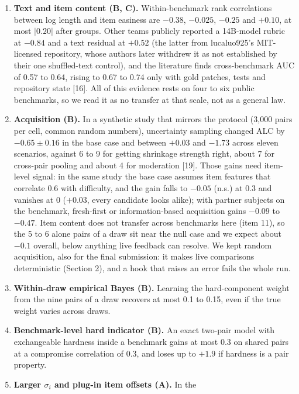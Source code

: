 \documentclass[
]{article}
\begin{document}
\begin{enumerate}
  to 27 labels at B1 to B3.
\item
  \textbf{Text and item content (B, C).} Within-benchmark rank
  correlations between log length and item easiness are \(-0.38\),
  \(-0.025\), \(-0.25\) and \(+0.10\), at most \(|0.20|\) after groups.
  Other teams publicly reported a 14B-model rubric at \(-0.84\) and a
  text residual at \(+0.52\) (the latter from lucaluo925's MIT-licensed
  repository, whose authors later withdrew it as not established by
  their one shuffled-text control), and the literature finds
  cross-benchmark AUC of 0.57 to 0.64, rising to 0.67 to 0.74 only with
  gold patches, tests and repository state {[}16{]}. All of this
  evidence rests on four to six public benchmarks, so we read it as no
  transfer at that scale, not as a general law.
\item
  \textbf{Acquisition (B).} In a synthetic study that mirrors the
  protocol (3,000 pairs per cell, common random numbers), uncertainty
  sampling changed ALC by \(-0.65 \pm 0.16\) in the base case and
  between \(+0.03\) and \(-1.73\) across eleven scenarios, against 6 to
  9 for getting shrinkage strength right, about 7 for cross-pair pooling
  and about 4 for moderation {[}19{]}. Those gains need item-level
  signal: in the same study the base case assumes item features that
  correlate 0.6 with difficulty, and the gain falls to \(-0.05\) (n.s.)
  at 0.3 and vanishes at 0 (\(+0.03\), every candidate looks alike);
  with partner subjects on the benchmark, fresh-first or
  information-based acquisition gains \(-0.09\) to \(-0.47\). Item
  content does not transfer across benchmarks here (item 11), so the 5
  to 6 alone pairs of a draw sit near the null case and we expect about
  \(-0.1\) overall, below anything live feedback can resolve. We kept
  random acquisition, also for the final submission: it makes live
  comparisons deterministic (Section 2), and a hook that raises an error
  fails the whole run.
\item
  \textbf{Within-draw empirical Bayes (B).} Learning the hard-component
  weight from the nine pairs of a draw recovers at most 0.1 to 0.15,
  even if the true weight varies across draws.
\item
  \textbf{Benchmark-level hard indicator (B).} An exact two-pair model
  with exchangeable hardness inside a benchmark gains at most 0.3 on
  shared pairs at a compromise correlation of 0.3, and loses up to
  \(+1.9\) if hardness is a pair property.
\item
  \textbf{Larger \(\sigma_i\) and plug-in item offsets (A).} In the

\end{enumerate}
\end{document}
